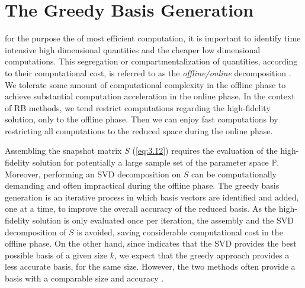 \section{The Greedy Basis Generation} \label{sec:3.3} 
for the purpose the of most efficient computation, it is important to identify time intensive high dimensional quantities and the cheaper low dimensional computations. This segregation or compartmentalization of quantities, according to their computational cost, is referred to as the \emph{offline/online} decomposition \cite{quarteroni2015reduced}. We tolerate some amount of computational complexity in the offline phase to achieve substantial computation acceleration in the online phase. In the context of RB methods, we tend restrict computations regarding the high-fidelity solution, only to the offline phase. Then we can enjoy fast computations by restricting all computations to the reduced space during the online phase.

Assembling the snapshot matrix $S$ (\ref{eq:3.12}) requires the evaluation of the high-fidelity solution for potentially a large sample set of the parameter space $\mathbb P$. Moreover, performing an SVD decomposition on $S$ can be computationally demanding and often impractical during the offline phase. The greedy basis generation is an iterative process in which basis vectors are identified and added, one at a time, to improve the overall accuracy of the reduced basis. As the high-fidelity solution is only evaluated once per iteration, the assembly and the SVD decomposition of $S$ is avoided, saving considerable computational cost in the offline phase. On the other hand, since  indicates that the SVD provides the best possible basis of a given size $k$, we expect that the greedy approach provides a less accurate basis, for the same size. However, the two methods often provide a basis with a comparable size and accuracy \cite{quarteroni2015reduced}.

